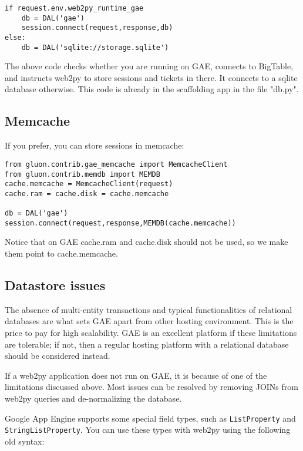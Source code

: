 \documentclass[justified,sixbynine,notoc]{tufte-book}
\def\ft{\small\tt}
\begin{document}
\begin{fullwidth}
\begin{lstlisting}
if request.env.web2py_runtime_gae
    db = DAL('gae')
    session.connect(request,response,db)
else:
    db = DAL('sqlite://storage.sqlite')
\end{lstlisting}

The above code checks whether you are running on GAE, connects to BigTable, and instructs web2py to store sessions and tickets in there. It connects to a sqlite database otherwise. This code is already in the scaffolding app in the file "db.py".

\goodbreak\subsection{Memcache}

If you prefer, you can store sessions in memcache:

\begin{lstlisting}
from gluon.contrib.gae_memcache import MemcacheClient
from gluon.contrib.memdb import MEMDB
cache.memcache = MemcacheClient(request)
cache.ram = cache.disk = cache.memcache

db = DAL('gae')
session.connect(request,response,MEMDB(cache.memcache))
\end{lstlisting}

Notice that on GAE cache.ram and cache.disk should not be used, so we make them point to cache.memcache.

\goodbreak\subsection{Datastore issues}

The absence of multi-entity transactions and typical functionalities of relational databases are what sets GAE apart from other hosting environment. This is the price to pay for high scalability. GAE is an excellent platform if these limitations are tolerable; if not, then a regular hosting platform with a relational database should be considered instead.

If a web2py application does not run on GAE, it is because of one of the limitations discussed above. Most issues can be resolved by removing JOINs from web2py queries and de-normalizing the database.

Google App Engine supports some special field types, such as {\ft ListProperty} and {\ft StringListProperty}. You can use these types with web2py using the following old syntax:


\end{fullwidth}
\end{document}
